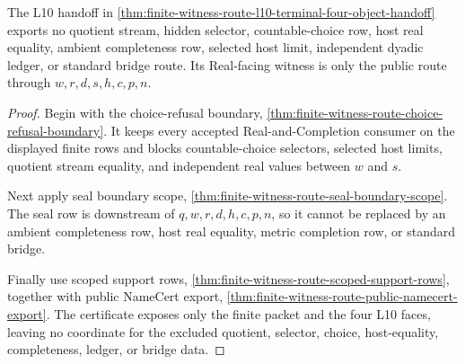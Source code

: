 \begin{theorem}
\label{thm:finite-witness-route-no-choice-real-completion-boundary}
The L10 handoff in \autoref{thm:finite-witness-route-l10-terminal-four-object-handoff} exports no quotient stream, hidden selector, countable-choice row, host real equality, ambient completeness row, selected host limit, independent dyadic ledger, or standard bridge route. Its Real-facing witness is only the public route through $w,r,d,s,h,c,p,n$.
\end{theorem}
\begin{proof}
Begin with the choice-refusal boundary, \autoref{thm:finite-witness-route-choice-refusal-boundary}. It keeps every accepted Real-and-Completion consumer on the displayed finite rows and blocks countable-choice selectors, selected host limits, quotient stream equality, and independent real values between $w$ and $s$.

Next apply seal boundary scope, \autoref{thm:finite-witness-route-seal-boundary-scope}. The seal row is downstream of $q,w,r,d,h,c,p,n$, so it cannot be replaced by an ambient completeness row, host real equality, metric completion row, or standard bridge.

Finally use scoped support rows, \autoref{thm:finite-witness-route-scoped-support-rows}, together with public NameCert export, \autoref{thm:finite-witness-route-public-namecert-export}. The certificate exposes only the finite packet and the four L10 faces, leaving no coordinate for the excluded quotient, selector, choice, host-equality, completeness, ledger, or bridge data.
\end{proof}

